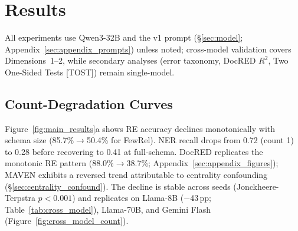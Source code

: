 \section{Results}
\label{sec:results}

All experiments use Qwen3-32B and the v1 prompt (\S\ref{sec:model}; Appendix~\ref{sec:appendix_prompts}) unless noted; cross-model validation covers Dimensions~1--2, while secondary analyses (error taxonomy, DocRED $R^2$, Two One-Sided Tests [TOST]) remain single-model.

\begin{table}[t]
\centering
\small
{}
\caption{Pairwise SCS--confusion correlation. Confusion rate is bidirectional $C(t_i{\to}t_j) + C(t_j{\to}t_i)$ divided by gold frequency sum; CIs are percentile bootstrap ($B{=}10{,}000$). FewRel ($r = 0.187$; \S\ref{sec:scs-validation}) excluded (per-instance RE format). Type-level cluster bootstrap CIs exclude zero (Few-NERD [0.069, 0.219]; MAVEN [0.081, 0.185]).}
\label{tab:pairwise}
\end{table}

\subsection{Count-Degradation Curves}
\label{sec:count_curves}

Figure~\ref{fig:main_results}a shows RE accuracy declines monotonically with schema size (85.7\%$\to$50.4\% for FewRel). NER recall drops from 0.72 (count 1) to 0.28 before recovering to 0.41 at full-schema. DocRED replicates the monotonic RE pattern (88.0\%$\to$38.7\%; Appendix~\ref{sec:appendix_figures}); MAVEN exhibits a reversed trend attributable to centrality confounding (\S\ref{sec:centrality_confound}). The decline is stable across seeds (Jonckheere-Terpstra $p < 0.001$) and replicates on Llama-8B ($-$43\,pp; Table~\ref{tab:cross_model}), Llama-70B, and Gemini Flash (Figure~\ref{fig:cross_model_count}).

